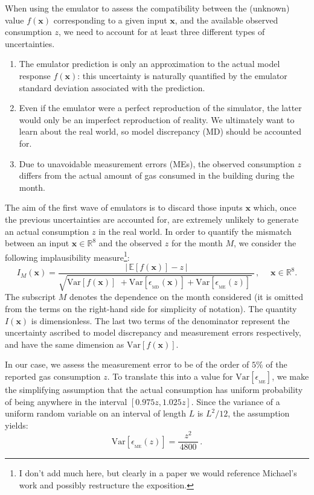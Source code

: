 \documentclass[a4paper, 12pt]{article}
\newcommand{\R}{\mathbb{R}}
\newcommand{\bd}[1]{\boldsymbol{#1}}
\newcommand{\x}{\bd x}
\newcommand{\E}{\mathbb{E}}
\newcommand{\Var}{\text{Var}}
\begin{document}
When using the emulator to assess the compatibility between the (unknown) value $f(\x)$ corresponding to a given input $\x$, and the available observed consumption $z$, we need to account for at least three different types of uncertainties.
\begin{enumerate}
 \item The emulator prediction is only an approximation to the actual model response
       $f(\x)$: this uncertainty is naturally quantified by the emulator standard deviation associated with the prediction.
 \item Even if the emulator were a perfect reproduction of the simulator, the latter
       would only be an imperfect reproduction of reality. We ultimately want to learn about the real world, so model discrepancy (MD) should be accounted for.
 \item Due to unavoidable measurement errors (MEs), the observed consumption $z$
       differs from the actual amount of gas consumed in the building during the month.
\end{enumerate}

The aim of the first wave of emulators is to discard those inputs $\x$ which, once the previous uncertainties are accounted for, are extremely unlikely to generate an actual consumption $z$ in the real world. In order to quantify the mismatch between an input $\x \in \R^8$ and the observed $z$ for the month $M$, we consider the following implausibility measure\footnote{
I don't add much here, but clearly in a paper we would reference Michael's work and possibly restructure the exposition.}:
\begin{equation}
 I_M(\x) = \frac{\big|\, \E[f(\x)] - z \,\big| }{ \sqrt{
 {\Var[f(\x)]}^{\phantom{i}} \!+ \Var[\epsilon_{_\text{MD}}(\x)] + \Var[\epsilon_{_\text{ME}}(z)] \,}^{\,}
       } \,, \;\quad \x \in \R^8.
\end{equation}
The subscript $M$ denotes the dependence on the month considered (it is omitted from the terms on the right-hand side for simplicity of notation).
The quantity $I(\x)$ is dimensionless. The last two terms of the denominator represent the uncertainty ascribed to model discrepancy and measurement errors respectively, and have the same dimension as $\Var[f(\x)]$.


In our case, we assess the measurement error to be of the order of $5\%$ of the reported gas consumption $z$. To translate this into a value for $\Var[\epsilon_{_\text{ME}}]$, we
make the simplifying assumption that the actual consumption has uniform probability of being anywhere in the interval $[0.975 z, 1.025 z]$. Since the variance of a uniform random variable on an interval of length $L$ is $L^2/12$, the assumption yields:
\begin{equation}
 \Var[\epsilon_{_\text{ME}}(z)] = \frac{z^2}{\,4800\,}\,.
\end{equation}
\end{document}
